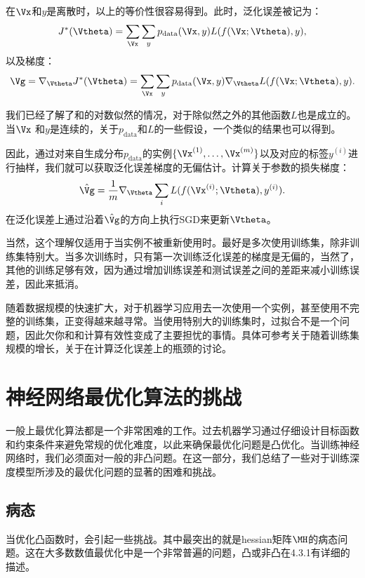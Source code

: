 在$\Vx$和$y$是离散时，以上的等价性很容易得到。此时，泛化误差被记为：
\begin{equation}
\label{eq:8.7}
    J^*(\Vtheta) = \sum_{\Vx} \sum_y p_{\text{data}}(\Vx, y) L(f(\Vx; \Vtheta),y),
\end{equation}
以及梯度：
\begin{equation}
\label{eq:8.8}
    \Vg = \nabla_{\Vtheta} J^*(\Vtheta) = \sum_{\Vx} \sum_y p_{\text{data}}
    (\Vx, y) \nabla_{\Vtheta} L(f(\Vx;\Vtheta),y) .
\end{equation}

我们已经了解了和的对数似然的情况，对于除似然之外的其他函数$L$也是成立的。当$\Vx$ 和$y$是连续的，关于$p_\text{data}$和$L$的一些假设，一个类似的结果也可以得到。

因此，通过对来自生成分布$p_\text{data}$的实例$\{ \Vx^{(1)}, \dots,\Vx^{(m)} \}$以及对应的标签$y^{(i)}$进行抽样，我们就可以获取泛化误差梯度的无偏估计。计算关于参数的损失梯度：
\begin{equation}
\label{eq:8.9}
    \hat{\Vg} = \frac{1}{m} \nabla_{\Vtheta} \sum_i L(f(\Vx^{(i)};\Vtheta),y^{(i)} ).
\end{equation}
在泛化误差上通过沿着$\hat{\Vg}$的方向上执行SGD来更新$\Vtheta$。

当然，这个理解仅适用于当实例不被重新使用时。最好是多次使用训练集，除非训练集特别大。当多次训练时，只有第一次训练泛化误差的梯度是无偏的，当然了，其他的训练足够有效，因为通过增加训练误差和测试误差之间的差距来减小训练误差，因此来抵消。

随着数据规模的快速扩大，对于机器学习应用去一次使用一个实例，甚至使用不完整的训练集，正变得越来越寻常。当使用特别大的训练集时，过拟合不是一个问题，因此欠你和和计算有效性变成了主要担忧的事情。具体可参考\cite{bottou-bousquet-2008}关于随着训练集规模的增长，关于在计算泛化误差上的瓶颈的讨论。

\section{神经网络最优化算法的挑战}
一般上最优化算法都是一个非常困难的工作。过去机器学习通过仔细设计目标函数和约束条件来避免常规的优化难度，以此来确保最优化问题是凸优化。当训练神经网络时，我们必须面对一般的非凸问题。在这一部分，我们总结了一些对于训练深度模型所涉及的最优化问题的显著的困难和挑战。

\subsection{病态}
当优化凸函数时，会引起一些挑战。其中最突出的就是\gls{hessian}矩阵$\MH$的病态问题。这在大多数数值最优化中是一个非常普遍的问题，凸或非凸在4.3.1有详细的描述。

